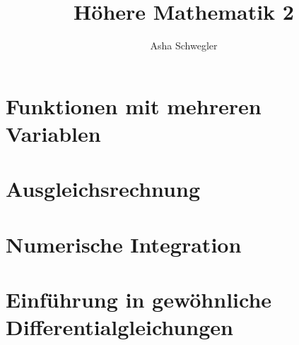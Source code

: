 \documentclass{article}
\title{Höhere Mathematik 2}
\author{Asha Schwegler}
\begin{document}
\maketitle
\tableofcontents
\newpage


\section{Funktionen mit mehreren Variablen}



\section{Ausgleichsrechnung}



\section{Numerische Integration}


\section{Einführung in gewöhnliche Differentialgleichungen}

\end{document}
